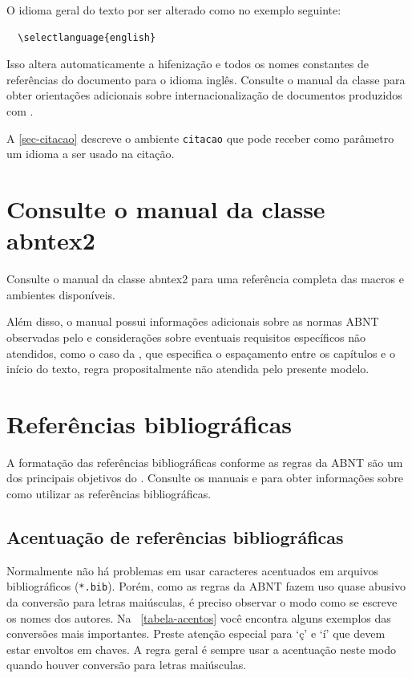 O idioma geral do texto por ser alterado como no exemplo seguinte:

\begin{verbatim}
  \selectlanguage{english}
\end{verbatim}

Isso altera automaticamente a hifenização e todos os nomes constantes de
referências do documento para o idioma inglês. Consulte o manual da classe
\cite{abntex2classe} para obter orientações adicionais sobre internacionalização de
documentos produzidos com \abnTeX.

A \autoref{sec-citacao} descreve o ambiente \texttt{citacao} que pode receber
como parâmetro um idioma a ser usado na citação.

\section{Consulte o manual da classe \textsf{abntex2}}

Consulte o manual da classe \textsf{abntex2} \cite{abntex2classe} para uma
referência completa das macros e ambientes disponíveis. 

Além disso, o manual possui informações adicionais sobre as normas ABNT
observadas pelo \abnTeX e considerações sobre eventuais requisitos específicos
não atendidos, como o caso da , que
especifica o espaçamento entre os capítulos e o início do texto, regra
propositalmente não atendida pelo presente modelo.

\section{Referências bibliográficas}

A formatação das referências bibliográficas conforme as regras da ABNT são um
dos principais objetivos do \abnTeX. Consulte os manuais
 e  para obter informações
sobre como utilizar as referências bibliográficas.

\subsection{Acentuação de referências bibliográficas}

Normalmente não há problemas em usar caracteres acentuados em arquivos
bibliográficos (\texttt{*.bib}). Porém, como as regras da ABNT fazem uso quase
abusivo da conversão para letras maiúsculas, é preciso observar o modo como se
escreve os nomes dos autores. Na ~\autoref{tabela-acentos} você encontra alguns
exemplos das conversões mais importantes. Preste atenção especial para `ç' e `í'
que devem estar envoltos em chaves. A regra geral é sempre usar a acentuação
neste modo quando houver conversão para letras maiúsculas.

